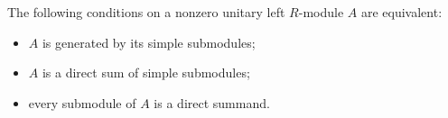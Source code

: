 The following conditions on a nonzero unitary left $R$-module $A$ are equivalent:
\begin{itemize}
\item[(i)] $A$ is generated by its simple submodules;
\item[(ii)] $A$ is a direct sum of simple submodules;
\item[(iii)] every submodule of $A$ is a direct summand.
\end{itemize}
